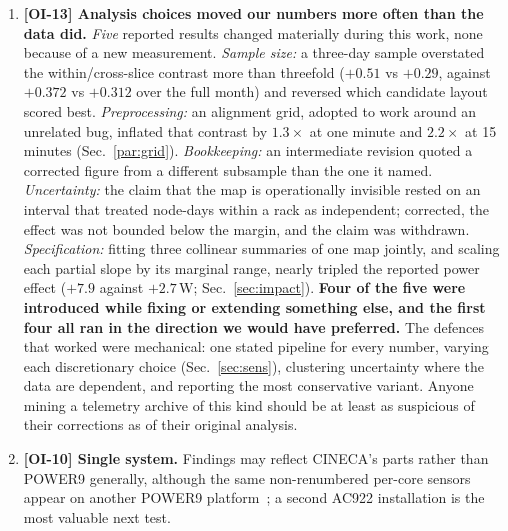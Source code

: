 \documentclass[10pt,conference]{IEEEtran}
\begin{document}
\begin{enumerate}
contrasts and by ordering tests it cannot bias. The per-socket matrices, with the support of every
cell, are part of the artefact, and every thermal interval resamples the 49 racks.
\item \textbf{[OI-13] Analysis choices moved our numbers more often than the data did.} \emph{Five}
reported results changed materially during this work, none because of a new measurement.
\emph{Sample size:} a three-day sample overstated the within/cross-slice contrast more than
threefold ($+0.51$ vs $+0.29$, against $+0.372$ vs $+0.312$ over the full month) and reversed which
candidate layout scored best. \emph{Preprocessing:} an alignment grid, adopted to work around an
unrelated bug, inflated that contrast by $1.3\times$ at one minute and $2.2\times$ at 15 minutes
(Sec.~\ref{par:grid}). \emph{Bookkeeping:} an intermediate revision quoted a corrected figure from
a different subsample than the one it named. \emph{Uncertainty:} the claim that the map is
operationally invisible rested on an interval that treated node-days within a rack as independent;
corrected, the effect was not bounded below the margin, and the claim was withdrawn.
\emph{Specification:} fitting three collinear summaries of one map jointly, and scaling each
partial slope by its marginal range, nearly tripled the reported power effect ($+7.9$ against
$+2.7$\,W; Sec.~\ref{sec:impact}). \textbf{Four of the five were introduced while fixing or
extending something else, and the first four all ran in the direction we would have preferred.}
The defences that worked were mechanical: one stated pipeline for every number, varying each
discretionary choice (Sec.~\ref{sec:sens}), clustering uncertainty where the data are dependent, and
reporting the most conservative variant. Anyone mining a telemetry archive of this kind should be
at least as suspicious of their corrections as of their original analysis.
\item \textbf{[OI-10] Single system.} Findings may reflect CINECA's parts rather than POWER9
generally, although the same non-renumbered per-core sensors appear on another POWER9
platform~\cite{smith2020p9layout}; a second AC922 installation is the most valuable next test.
\end{enumerate}
\end{document}
